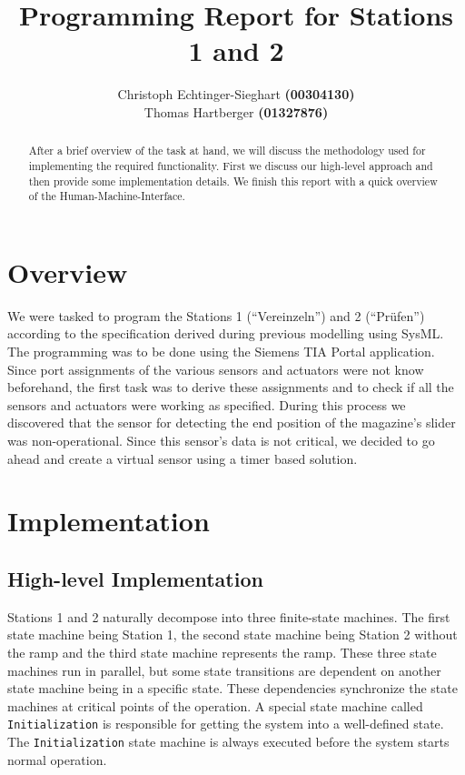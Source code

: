 \documentclass[12pt]{article}
\begin{document}
\title{Programming Report for Stations 1 and 2}
\author{
    Christoph Echtinger-Sieghart \textbf{(00304130)} \\
    Thomas Hartberger \textbf{(01327876)}
}
\maketitle

\begin{abstract}
After a brief overview of the task at hand, we will discuss the methodology used for implementing
the required functionality. First we discuss our high-level approach and then provide some
implementation details. We finish this report with a quick overview of the Human-Machine-Interface.
\end{abstract}

\section{Overview}
We were tasked to program the Stations 1 (``Vereinzeln'') and 2 (``Pr\"ufen'') according to
the specification derived during previous modelling using SysML. The programming was to be
done using the Siemens TIA Portal application. Since port assignments of the various sensors
and actuators were not know beforehand, the first task was to derive these assignments
and to check if all the sensors and actuators were working as specified. During this process
we discovered that the sensor for detecting the end position of the magazine's slider was
non-operational. Since this sensor's data is not critical, we decided to go ahead and create a virtual sensor
using a timer based solution. 

\section{Implementation}

\subsection{High-level Implementation}

Stations 1 and 2 naturally decompose into three finite-state machines. The first state machine being
Station 1, the second state machine being Station 2 without the ramp and the third state machine
represents the ramp. These three state machines run in parallel, but some state transitions are dependent
on another state machine being in a specific state. These dependencies synchronize the state machines
at critical points of the operation.
A special state machine called \texttt{Initialization} is responsible for getting the system into
a well-defined state. The \texttt{Initialization} state machine is always executed before the system
starts normal operation.
\end{document}
